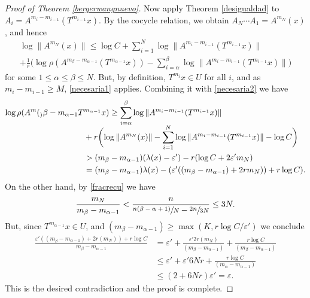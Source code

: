 \documentclass[JEP,XML,SOM,Unicode,NoEqCountersInSection]{cedram}
\let\epsilon\varepsilon
\theoremstyle{plain}
\theoremstyle{definition}
\newcommand{\ccl}[3]{#1^{#2}(#3)}
\begin{document}
\begin{proof}[Proof of Theorem \ref{bergerwangnuevo}]
Now apply Theorem \ref{desigualdad} to $A_{i}=\ccl{A}{m_i-m_{i-1}}{T^{m_{i-1}}x}$. By the cocycle relation, we obtain $A_{N}\cdots A_{1}=\ccl{A}{m_N}{x}$, and hence
\begin{multline}\label{necesaria2}
\log{\|\ccl{A}{m_N}{x}\|} \leq \log{C}+\sum_{i=1}^{N}{\log{\|\ccl{A}{m_i-m_{i-1}}{T^{m_{i-1}}x}\|}} \\[-5pt]
+ \frac{1}{r}\biggl(\log{\rho(\ccl{A}{m_{\beta}-m_{\alpha-1}}{T^{m_{\alpha-1}}x})}-\sum_{i=\alpha}^{\beta}{\log{\|\ccl{A}{m_i-m_{i-1}}{T^{m_{i-1}}x}\|}}\biggr)
\end{multline}
for some $1\leq \alpha\leq \beta\leq N$. But, by definition, $T^{m_i}x\!\in\!U$ for all $i$, and as \hbox{$m_i-m_{i-1}\!\geq\!M$}, \eqref{necesaria1} applies. Combining it with \eqref{necesaria2} we have
\begin{equation*}
\begin{split}
\log\rho(\ccl{A}m_{\beta}-m_{\alpha-1}T&^{m_{\alpha-1}}x) \geq
\sum_{i=\alpha}^{\beta}{\log{\|\ccl{A}{m_i-m_{i-1}}{T^{m_{i-1}}x}\|}} \\[-5pt]
& +r\biggl( \log{\|\ccl{A}{m_N}{x}\|}-\sum_{i=1}^{N}{\log{\|\ccl{A}{m_i-m_{i-1}}{T^{m_{i-1}}x}\|}} -\log{C} \biggr)\\
& > (m_{\beta}-m_{\alpha-1})(\lambda(x)-\epsilon')-r(\log{C}+2\epsilon'm_N)\\
& = (m_{\beta}-m_{\alpha-1})\lambda(x)-( \epsilon'((m_{\beta}-m_{\alpha-1})+2rm_N))+r\log{C}).
\end{split}
\end{equation*}
On the other hand, by \eqref{fracrecu} we have
\begin{equation*}
\frac{m_N}{m_{\beta}-m_{\alpha-1}}<\frac{n}{\sfrac{n(\beta-\alpha+1)}{N}-\sfrac{2n}{3N}}\leq 3N.
\end{equation*}
But, since $T^{m_{\alpha-1}}x\in U$, and $(m_{\beta}-m_{\alpha-1})\geq \max(K,r\log{C}/\epsilon')$ we conclude
\begin{equation*}
\begin{split}
\frac{\epsilon'((m_{\beta}-m_{\alpha-1})+2r(m_N))+r\log{C} }{m_{\beta}-m_{\alpha-1}} & = \epsilon'+\frac{\epsilon'2r(m_N)}{(m_{\beta}-m_{\alpha-1})}+\frac{r\log{C}}{(m_{\beta}-m_{\alpha-1})} \\
& \leq \epsilon'+\epsilon'6Nr+\frac{r\log{C}}{(m_{\alpha}-m_{\alpha-1})}\\
& \leq (2+6Nr)\epsilon'=\epsilon.
\end{split}
\end{equation*}
This is the desired contradiction and the proof is complete.
\end{proof}
\end{document}
